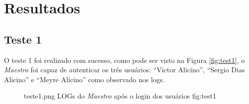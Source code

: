 \section{Resultados}

% 
% 
% 
% 


\subsection{Teste 1}
O teste 1 foi realizado com sucesso, como pode ser visto na Figura \ref{fig:test1}, o \emph{Maestro} foi capaz de autenticar os três usuários:
``Victor Alicino'', ``Sergio Dias Alicino'' e ``Meyre Alicino'' como observado nos logs.

\begin{figure}[h!]
    {teste1.png}
    {LOGs do \emph{Maestro} após o login dos usuários}
    {fig:test1}
\end{figure}


